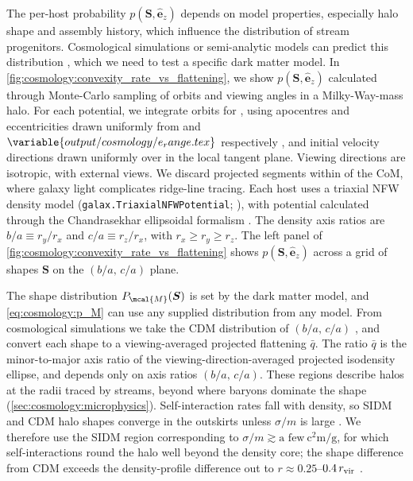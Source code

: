 \documentclass[linenumbers,twocolumn]{aastex701}
\renewcommand{\mbf}[1]{\boldsymbol{#1}}
\newcommand{\zhat}{\hat{\mbf{e}}_z} %
\begin{document}
        The per-host probability $p(\mbf{S},\zhat)$ depends on model properties, especially halo shape and assembly history, which influence the distribution of stream progenitors. %
        Cosmological simulations or semi-analytic models can predict this distribution \citep[e.g.,][]{Dropulic+:2025}, which we need to test a specific dark matter model. %
        In \autoref{fig:cosmology:convexity_rate_vs_flattening}, we show $p(\mbf{S},\zhat)$ calculated through Monte-Carlo sampling of orbits and viewing angles in a Milky-Way-mass halo. %
        For each potential, we integrate  orbits for , using apocentres and eccentricities drawn uniformly from  and $\variable{output/cosmology/e_range.tex}$ respectively \citep{Sandford+:2017:QuantifyingTidalStream}, and initial velocity directions drawn uniformly over  in the local tangent plane. %
        Viewing directions are isotropic, with  external views.  %
        We discard projected segments within  of the \gls{CoM}, where galaxy light complicates ridge-line tracing. %
        Each host uses a triaxial \gls{NFW} density model (\texttt{galax.TriaxialNFWPotential}; \citealt{galax}), with potential calculated through the Chandrasekhar ellipsoidal formalism \citep{Chandrasekhar:1969:EllipsoidalFiguresEquilibrium, Binney+Tremaine:2008:GalacticDynamics}. %
        The density axis ratios are $b/a \equiv r_y/r_x$ and $c/a \equiv r_z/r_x$, with $r_x \ge r_y \ge r_z$. %
        The left panel of \autoref{fig:cosmology:convexity_rate_vs_flattening} shows $p(\mbf{S},\zhat)$ across a grid of shapes $\mbf{S}$ on the $(b/a,\,c/a)$ plane. %

        The shape distribution $P_{\mcal{M}}(\mbf{S})$ is set by the dark matter model, and \cref{eq:cosmology:p_M} can use any supplied distribution from any model. %
        From cosmological simulations we take the \gls{CDM} distribution of $(b/a,\,c/a)$ \citep{Brinckmann+:2018:StructureAssemblyHistory,Giocoli+:2026:AIDATNGProject3D}, and convert each shape to a viewing-averaged projected flattening $\bar{q}$. %
        The ratio $\bar{q}$ is the minor-to-major axis ratio of the viewing-direction-averaged projected isodensity ellipse, and depends only on axis ratios $(b/a,\,c/a)$. %
        These regions describe halos at the radii traced by streams, beyond where baryons dominate the shape (\autoref{sec:cosmology:microphysics}). %
        Self-interaction rates fall with density, so \gls{SIDM} and \gls{CDM} halo shapes converge in the outskirts unless $\sigma/m$ is large \citep{Peter+:2013:CosmologicalSimulationsSelfInteracting}. %
        We therefore use the \gls{SIDM} region corresponding to $\sigma/m\gtrsim\text{a few}\ \unit{\square\centi\meter\per\gram}$, for which self-interactions round the halo well beyond the density core; the shape difference from \gls{CDM} exceeds the density-profile difference out to $r\approx0.25$--$0.4\,r_{\rm vir}$ \citep{Fischer+:2022:CosmologicalSimulationsRare,Fischer+:2024:CosmologicalIdealizedSimulations}. %
\end{document}
